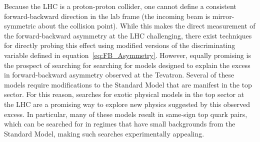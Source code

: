
Because the LHC is a proton-proton collider, one cannot define a consistent forward-backward direction in the lab frame (the incoming beam is mirror-symmetric about the collision point).
While this makes the direct measurement of the forward-backward asymmetry at the LHC challenging, there exist techniques for directly probing this effect using modified versions of the discriminating variable defined in equation~\ref{eq:FB_Asymmetry}.
However, equally promising is the prospect of searching for searching for models designed to explain the excess in forward-backward asymmetry observed at the Tevatron.
Several of these models require modifications to the Standard Model that are manifest in the top sector.
For this reason, searches for exotic physical models in the top sector at the LHC are a promising way to explore new physics suggested by this observed excess.
In particular, many of these models result in same-sign top quark pairs, which can be searched for in regimes that have small backgrounds from the Standard Model, making such searches experimentally appealing.

